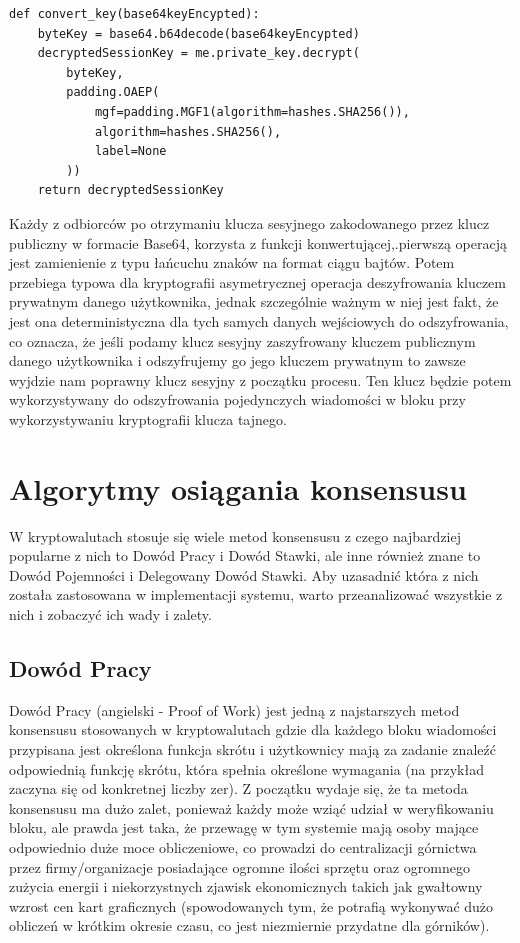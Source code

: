 \begin{lstlisting}
def convert_key(base64keyEncypted):
    byteKey = base64.b64decode(base64keyEncypted)
    decryptedSessionKey = me.private_key.decrypt(
        byteKey,
        padding.OAEP(
            mgf=padding.MGF1(algorithm=hashes.SHA256()),
            algorithm=hashes.SHA256(),
            label=None
        ))
    return decryptedSessionKey
\end{lstlisting}
Każdy z odbiorców po otrzymaniu klucza sesyjnego zakodowanego przez klucz publiczny w formacie Base64, korzysta z funkcji konwertującej,.pierwszą operacją jest zamienienie z typu łańcuchu znaków na format ciągu bajtów. Potem przebiega typowa dla kryptografii asymetrycznej operacja deszyfrowania kluczem prywatnym danego użytkownika, jednak szczególnie ważnym w niej jest fakt, że jest ona deterministyczna dla tych samych danych wejściowych do odszyfrowania, co oznacza, że jeśli podamy klucz sesyjny zaszyfrowany kluczem publicznym danego użytkownika i odszyfrujemy go jego kluczem prywatnym to zawsze wyjdzie nam poprawny klucz sesyjny z początku procesu. Ten klucz będzie potem wykorzystywany do odszyfrowania pojedynczych wiadomości w bloku przy wykorzystywaniu kryptografii klucza tajnego.

\section{Algorytmy osiągania konsensusu}
W kryptowalutach stosuje się wiele metod konsensusu z czego najbardziej popularne z nich to Dowód Pracy i Dowód Stawki, ale inne również znane to Dowód Pojemności i Delegowany Dowód Stawki. Aby uzasadnić która z nich została zastosowana w implementacji systemu, warto przeanalizować wszystkie z nich i zobaczyć ich wady i zalety.
\subsection{Dowód Pracy}
Dowód Pracy (angielski - Proof of Work) jest jedną z najstarszych metod konsensusu stosowanych w kryptowalutach gdzie dla każdego bloku wiadomości przypisana jest określona funkcja skrótu i użytkownicy mają za zadanie znaleźć odpowiednią funkcję skrótu, która spełnia określone wymagania (na przykład zaczyna się od konkretnej liczby zer). Z początku wydaje się, że ta metoda konsensusu ma dużo zalet, ponieważ każdy może wziąć udział w weryfikowaniu bloku, ale prawda jest taka, że przewagę w tym systemie mają osoby mające odpowiednio duże moce obliczeniowe, co prowadzi do centralizacji górnictwa przez firmy/organizacje posiadające ogromne ilości sprzętu oraz ogromnego zużycia energii i niekorzystnych zjawisk ekonomicznych takich jak gwałtowny wzrost cen kart graficznych (spowodowanych tym, że potrafią wykonywać dużo obliczeń w krótkim okresie czasu, co jest niezmiernie przydatne dla górników).


